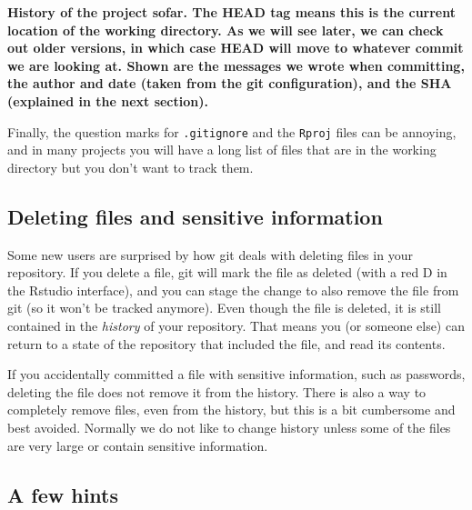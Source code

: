 \documentclass[]{book}
\begin{document}
\textbf{History of the project sofar. The HEAD tag means this is the current location of the working directory. As we will see later, we can check out older versions, in which case HEAD will move to whatever commit we are looking at. Shown are the messages we wrote when committing, the author and date (taken from the git configuration), and the SHA (explained in the next section).}

Finally, the question marks for \texttt{.gitignore} and the \texttt{Rproj} files can be annoying, and in many projects you will have a long list of files that are in the working directory but you don't want to track them.

\hypertarget{deleting-files-and-sensitive-information}{%
\subsection{Deleting files and sensitive information}\label{deleting-files-and-sensitive-information}}

Some new users are surprised by how git deals with deleting files in your repository. If you delete a file, git will mark the file as deleted (with a red D in the Rstudio interface), and you can stage the change to also remove the file from git (so it won't be tracked anymore). Even though the file is deleted, it is still contained in the \emph{history} of your repository. That means you (or someone else) can return to a state of the repository that included the file, and read its contents.

If you accidentally committed a file with sensitive information, such as passwords, deleting the file does not remove it from the history. There is also a way to completely remove files, even from the history, but this is a bit cumbersome and best avoided. Normally we do not like to change history unless some of the files are very large or contain sensitive information.

\hypertarget{a-few-hints}{%
\subsection{A few hints}\label{a-few-hints}}
\end{document}
